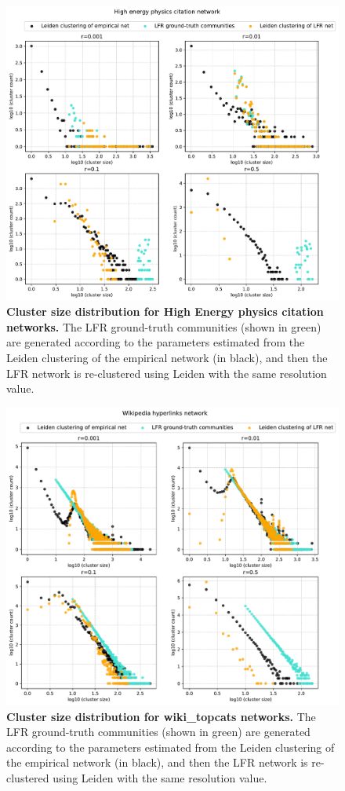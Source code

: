 \documentclass[a4paper]{article}   	%
\begin{document}
\begin{figure}[H]
\centering
\includegraphics[width=0.85\linewidth]{figs/cit_hepph_cm_size.pdf}
\caption[Cluster size distribution for High Energy physics citation networks.]{\textbf{Cluster size distribution for High Energy physics citation networks.} The LFR ground-truth communities (shown in green) are generated according to the parameters estimated from the Leiden clustering of the empirical network (in black), and then the LFR network is re-clustered using Leiden with the same resolution value. }
\label{fig:cit_hepph_cm_size}
\end{figure}


\begin{figure}[H]
\centering
\includegraphics[width=0.85\linewidth]{figs/wiki_topcats_cm_size.pdf}
\caption[Cluster size distribution for Wikipedia hyperlink networks.]{\textbf{Cluster size distribution for wiki\_topcats   networks.} The LFR ground-truth communities (shown in green) are generated according to the parameters estimated from the Leiden clustering of the empirical network (in black), and then the LFR network is re-clustered using Leiden with the same resolution value. }
\label{fig:wiki_topcats_cm_size}
\end{figure}
\end{document}
